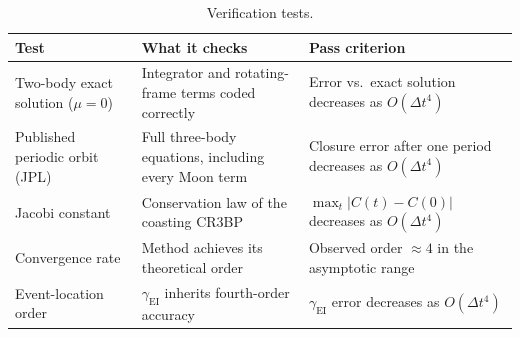 \documentclass[11pt]{article}
\newcommand{\gEI}{\gamma_{\mathrm{EI}}}
\begin{document}
\begin{table}[h]
\centering
\caption{Verification tests.}
\label{tab:verify}
\begin{tabular}{@{}p{3.6cm}p{5.4cm}p{5.2cm}@{}}
\toprule
Test & What it checks & Pass criterion \\
\midrule
Two-body exact solution ($\mu = 0$) & Integrator and rotating-frame terms coded correctly & Error vs.\ exact solution decreases as $O(\Delta t^4)$ \\
Published periodic orbit (JPL) & Full three-body equations, including every Moon term & Closure error after one period decreases as $O(\Delta t^4)$ \\
Jacobi constant & Conservation law of the coasting CR3BP & $\max_t |C(t) - C(0)|$ decreases as $O(\Delta t^4)$ \\
Convergence rate & Method achieves its theoretical order & Observed order $\approx 4$ in the asymptotic range \\
Event-location order & $\gEI$ inherits fourth-order accuracy & $\gEI$ error decreases as $O(\Delta t^4)$ \\
\bottomrule
\end{tabular}
\end{table}
\end{document}
